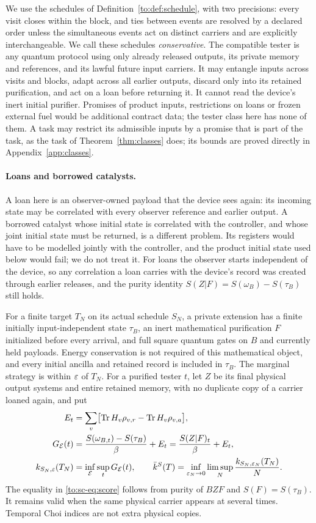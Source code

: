 We use the schedules of Definition~\ref{to:def:schedule}, with two precisions: every visit closes within the block, and ties between events are resolved by a declared order unless the simultaneous events act on distinct carriers and are explicitly interchangeable. We call these schedules \emph{conservative}.
The compatible tester is any quantum protocol using only already released outputs, its private memory and references, and its lawful future input carriers. It may entangle inputs across visits and blocks, adapt across all earlier outputs, discard only into its retained purification, and act on a loan before returning it. It cannot read the device's inert initial purifier. Promises of product inputs, restrictions on loans or frozen external fuel would be additional contract data; the tester class here has none of them. A task may restrict its admissible inputs by a promise that is part of the task, as the task of Theorem~\ref{thm:classes} does; its bounds are proved directly in Appendix~\ref{app:classes}.

\paragraph{Loans and borrowed catalysts.}
A loan here is an observer-owned payload that the device sees again: its incoming state may be correlated with every observer reference and earlier output. A borrowed catalyst whose initial state is correlated with the controller, and whose joint initial state must be returned, is a different problem. Its registers would have to be modelled jointly with the controller, and the product initial state used below would fail; we do not treat it. For loans the observer starts independent of the device, so any correlation a loan carries with the device's record was created through earlier releases, and the purity identity $S(Z|F)=S(\omega_B)-S(\tau_B)$ still holds.

For a finite target $T_N$ on its actual schedule $S_N$, a private extension has a finite initially input-independent state $\tau_B$, an inert mathematical purification $F$ initialized before every arrival, and full square quantum gates on $B$ and currently held payloads. Energy conservation is not required of this mathematical object, and every initial ancilla and retained record is included in $\tau_B$. The marginal strategy is within $\varepsilon$ of $T_N$. For a purified tester $t$, let $Z$ be its final physical output systems and entire retained memory, with no duplicate copy of a carrier loaned again, and put
\begin{align}
E_t&=\sum_v\bigl[\operatorname{Tr} H_v\rho_{v,r}-\operatorname{Tr} H_v\rho_{v,a}\bigr],\label{to:sc-eq:flux}\\
G_{\mathcal E}(t)&=\frac{S(\omega_{B,t})-S(\tau_B)}{\beta}+E_t
=\frac{S(Z|F)_t}{\beta}+E_t,\label{to:sc-eq:score}\\
k_{S_N,\varepsilon}(T_N)&=\inf_{\mathcal E}\sup_tG_{\mathcal E}(t),\qquad
\bar k^S(T)=\inf_{\varepsilon_N\to0}\limsup_N\frac{k_{S_N,\varepsilon_N}(T_N)}{N}.\label{to:sc-eq:rate}
\end{align}
The equality in \eqref{to:sc-eq:score} follows from purity of $BZF$ and $S(F)=S(\tau_B)$. It remains valid when the same physical carrier appears at several times. Temporal Choi indices are not extra physical copies.


